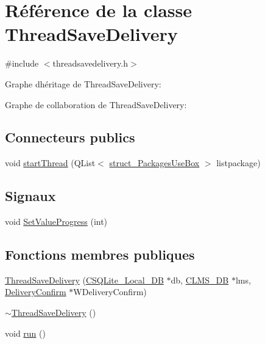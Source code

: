 \hypertarget{class_thread_save_delivery}{}\section{Référence de la classe Thread\+Save\+Delivery}
\label{class_thread_save_delivery}


{\ttfamily \#include $<$threadsavedelivery.\+h$>$}



Graphe d\textquotesingle{}héritage de Thread\+Save\+Delivery\+:


Graphe de collaboration de Thread\+Save\+Delivery\+:
\subsection*{Connecteurs publics}
\begin{DoxyCompactItemize}
\item 
void \hyperlink{class_thread_save_delivery_a95152e21b678effb4c8e281f3676af45}{start\+Thread} (Q\+List$<$ \hyperlink{structstruct___packages_use_box}{struct\+\_\+\+Packages\+Use\+Box} $>$ listpackage)
\end{DoxyCompactItemize}
\subsection*{Signaux}
\begin{DoxyCompactItemize}
\item 
void \hyperlink{class_thread_save_delivery_a5a581b804e7ee5127255fe86c4badbb7}{Set\+Value\+Progress} (int)
\end{DoxyCompactItemize}
\subsection*{Fonctions membres publiques}
\begin{DoxyCompactItemize}
\item 
\hyperlink{class_thread_save_delivery_a4146ac3fea2efe4b3606d8d9f6f3cd0e}{Thread\+Save\+Delivery} (\hyperlink{class_c_s_q_lite___local___d_b}{C\+S\+Q\+Lite\+\_\+\+Local\+\_\+\+D\+B} $\ast$db, \hyperlink{class_c_l_m_s___d_b}{C\+L\+M\+S\+\_\+\+D\+B} $\ast$lms, \hyperlink{class_delivery_confirm}{Delivery\+Confirm} $\ast$W\+Delivery\+Confirm)
\item 
\hyperlink{class_thread_save_delivery_af1f7fcfa02547a3d29c8e62beaa249ca}{$\sim$\+Thread\+Save\+Delivery} ()
\item 
void \hyperlink{class_thread_save_delivery_a4975505f89e79a8cfb90a6a6d7d1f1b0}{run} ()
\end{DoxyCompactItemize}


